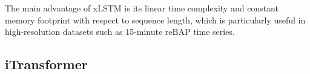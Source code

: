 \documentclass[class=scrbook, crop=false]{standalone}
\begin{document}
The main advantage of xLSTM is its linear time complexity and constant memory footprint with respect to sequence length, which is particularly useful in high-resolution datasets such as 15-minute reBAP time series.








\subsection{iTransformer}
\label{Section::iTransformer}
\end{document}
